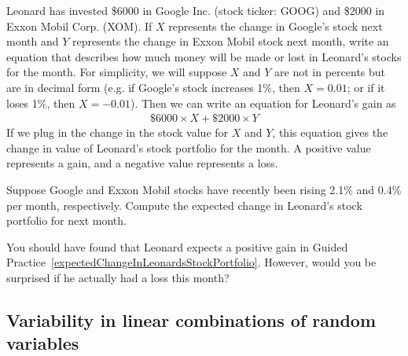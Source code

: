 \begin{examplewrap}
\begin{nexample}{Leonard has invested \$6000 in Google Inc. (stock ticker: GOOG) and \$2000 in Exxon Mobil Corp. (XOM). If $X$ represents the change in Google's stock next month and $Y$ represents the change in Exxon Mobil stock next month, write an equation that describes how much money will be made or lost in Leonard's stocks for the month.}
For simplicity, we will suppose $X$ and $Y$ are not in percents but are in decimal form (e.g. if Google's stock increases 1\%, then $X=0.01$; or if it loses 1\%, then $X=-0.01$). Then we can write an equation for Leonard's gain as
\begin{align*}
\$6000\times X + \$2000\times Y
\end{align*}
If we plug in the change in the stock value for $X$ and $Y$, this equation gives the change in value of Leonard's stock portfolio for the month. A positive value represents a gain, and a negative value represents a loss.
\end{nexample}
\end{examplewrap}

\begin{exercisewrap}
\begin{nexercise}\label{expectedChangeInLeonardsStockPortfolio}
Suppose Google and Exxon Mobil stocks have recently been rising 2.1\% and 0.4\% per month, respectively. Compute the expected change in Leonard's stock portfolio for next month.\footnotemark
\end{nexercise}
\end{exercisewrap}

\begin{exercisewrap}
\begin{nexercise}
You should have found that Leonard expects a positive gain in Guided Practice~\ref{expectedChangeInLeonardsStockPortfolio}. However, would you be surprised if he actually had a loss this month?\footnotemark
\end{nexercise}
\end{exercisewrap}

\subsection{Variability in linear combinations of random variables}

